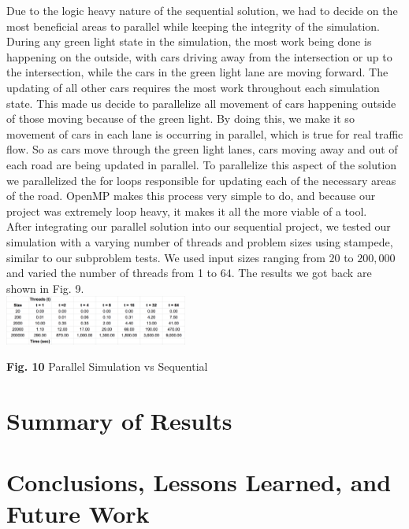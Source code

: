 \documentclass[conference]{IEEEtran}
\begin{document}
\hspace*{.2cm} Due to the logic heavy nature of the sequential solution, we had to decide on the most beneficial areas to parallel while keeping the integrity of the simulation. During any green light state in the simulation, the most work being done is happening on the outside, with cars driving away from the intersection or up to the intersection, while the cars in the green light lane are moving forward. The updating of all other cars requires the most work throughout each simulation state. This made us decide to parallelize all movement of cars happening outside of those moving because of the green light. By doing this, we make it so movement of cars in each lane is occurring in parallel, which is true for real traffic flow. So as cars move through the green light lanes, cars moving away and out of each road are being updated in parallel. To parallelize this aspect of the solution we parallelized the for loops responsible for updating each of the necessary areas of the road. OpenMP makes this process very simple to do, and because our project was extremely loop heavy, it makes it all the more viable of a tool. \\

\hspace*{.2cm} After integrating our parallel solution into our sequential project, we tested our simulation with a varying number of threads and problem sizes using stampede, similar to our subproblem tests. We used input sizes ranging from $20$ to $200,000$ and varied the number of threads from 1 to 64. The results we got back are shown in Fig. 9. \\

\includegraphics[width=0.45\textwidth]{results}
\begin{center}
	\textbf{Fig. 10} Parallel Simulation vs Sequential \\
\end{center}


\section{Summary of Results}
\lipsum[4]

\section{Conclusions, Lessons Learned, and Future Work}
\lipsum[5]



\end{document}
